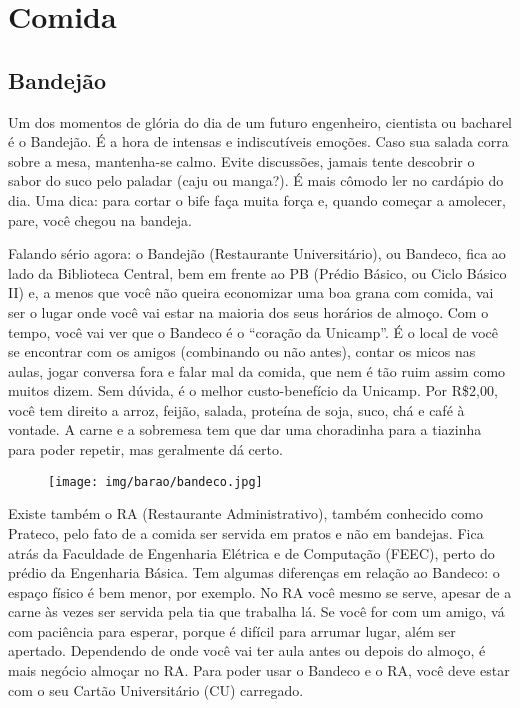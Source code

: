 
\section{Comida}
\subsection{Bandejão}

Um dos momentos de glória do dia de um futuro engenheiro, cientista ou bacharel
é o Bandejão. É a hora de intensas e indiscutíveis emoções. Caso sua salada
corra sobre a mesa, mantenha-se calmo. Evite discussões, jamais tente descobrir
o sabor do suco pelo paladar (caju ou manga?). É mais cômodo ler no cardápio do
dia. Uma dica: para cortar o bife faça muita força e, quando começar a amolecer,
pare, você chegou na bandeja.

Falando sério agora: o Bandejão (Restaurante Universitário), ou Bandeco,
fica ao lado da Biblioteca Central, bem em frente ao PB (Prédio Básico, ou Ciclo
Básico II) e, a menos que você não queira economizar uma boa grana com comida,
vai ser o lugar onde você vai estar na maioria dos seus horários de almoço. Com
o tempo, você vai ver que o Bandeco é o ``coração da Unicamp''. É o local de
você se encontrar com os amigos (combinando ou não antes), contar os micos nas
aulas, jogar conversa fora e falar mal da comida, que nem é tão ruim assim como
muitos dizem. Sem dúvida, é o melhor custo-benefício da Unicamp. Por R\$2,00,
você tem direito a arroz, feijão, salada, proteína de soja, suco, chá e café à
vontade.  A carne e a sobremesa tem que dar uma choradinha para a tiazinha para
poder repetir, mas geralmente dá certo.

\begin{figure}[h!]
    \centering
    \texttt{[image: img/barao/bandeco.jpg]}
\end{figure}

Existe também o RA (Restaurante Administrativo), também conhecido como Prateco,
pelo fato de a comida ser servida em pratos e não em bandejas. Fica atrás da
Faculdade de Engenharia Elétrica e de Computação (FEEC), perto do prédio da
Engenharia Básica. Tem algumas diferenças em relação ao Bandeco: o espaço físico
é bem menor, por exemplo. No RA você mesmo se serve, apesar de a carne às vezes
ser servida pela tia que trabalha lá. Se você for com um amigo, vá com paciência
para esperar, porque é difícil para arrumar lugar, além ser apertado. Dependendo
de onde você vai ter aula antes ou depois do almoço, é mais negócio almoçar no
RA. Para poder usar o Bandeco e o RA, você deve estar com o seu Cartão
Universitário (CU) carregado.

